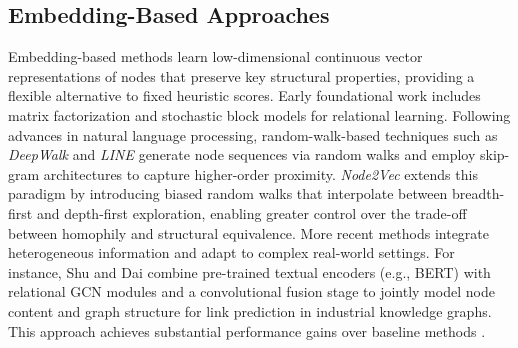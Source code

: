 \documentclass[pdflatex,sn-mathphys-num]{sn-jnl}%
\theoremstyle{thmstyleone}%
\theoremstyle{thmstyletwo}%
\theoremstyle{thmstylethree}%
\theoremstyle{plain} %
\theoremstyle{definition} %
\theoremstyle{remark} %
\theoremstyle{plain} %
\begin{document}
\subsection{Embedding-Based Approaches}
Embedding-based methods learn low-dimensional continuous vector representations of nodes that preserve key structural properties, providing a flexible alternative to fixed heuristic scores. 
Early foundational work includes matrix factorization \cite{koren2009matrix} and stochastic block models for relational learning. 
Following advances in natural language processing, random-walk-based techniques such as \textit{DeepWalk} and \textit{LINE} \cite{28ganaie2022ensemble,29tang2015line} generate node sequences via random walks and employ skip-gram architectures to capture higher-order proximity. 
\textit{Node2Vec} \cite{40grover2016node2vec} extends this paradigm by introducing biased random walks that interpolate between breadth-first and depth-first exploration, enabling greater control over the trade-off between homophily and structural equivalence. 
More recent methods integrate heterogeneous information and adapt to complex real-world settings. 
For instance, Shu and Dai \cite{Shu2023IndustrialKG} combine pre-trained textual encoders (e.g., BERT) with relational GCN modules and a convolutional fusion stage to jointly model node content and graph structure for link prediction in industrial knowledge graphs.
This approach achieves substantial performance gains over baseline methods \cite{Arrar2024Survey}.

\end{document}
